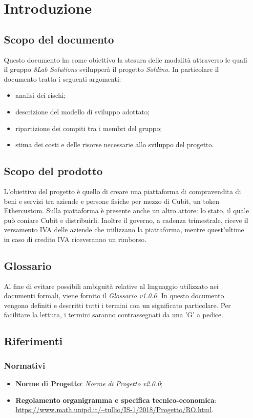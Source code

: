 \section{Introduzione}
\subsection{Scopo del documento}
Questo documento ha come obiettivo la stesura delle modalità attraverso le quali il gruppo \textit{8Lab Solutions} svilupperà il progetto \textit{Soldino}. In particolare il documento tratta i seguenti argomenti:
\begin{itemize}
	\item analisi dei rischi;
	\item descrizione del modello di sviluppo adottato;
	\item ripartizione dei compiti tra i membri del gruppo;
	\item stima dei costi e delle risorse necessarie allo sviluppo del progetto.
\end{itemize}
\subsection{Scopo del prodotto}
L'obiettivo del progetto è quello di creare una piattaforma di compravendita di beni e servizi tra aziende e persone fisiche per mezzo di  Cubit\glo, un token Ether\glosp custom. Sulla piattaforma è presente anche un altro attore: lo stato, il quale può coniare Cubit
 e distribuirli. Inoltre il governo, a cadenza trimestrale, riceve il versamento IVA delle aziende che utilizzano la piattaforma, mentre quest'ultime in caso di credito IVA riceveranno un rimborso.
\subsection{Glossario}
Al fine di evitare possibili ambiguità relative al linguaggio utilizzato nei documenti formali, viene fornito il \textit{Glossario v1.0.0}. In questo documento vengono definiti e descritti tutti i termini con un significato particolare. Per facilitare la lettura, i termini saranno contrassegnati da una 'G' a pedice.
\subsection{Riferimenti}
\subsubsection{Normativi}
\begin{itemize}
	\item \textbf{Norme di Progetto}: \textit{Norme di Progetto v2.0.0};
	\item \textbf{Regolamento organigramma e specifica tecnico-economica}: \\
	\url{https://www.math.unipd.it/~tullio/IS-1/2018/Progetto/RO.html}.
\end{itemize}

